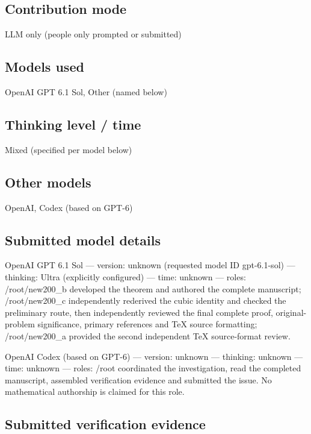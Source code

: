 \documentclass[11pt]{article}
\begin{document}
\subsection{Contribution mode}

LLM only (people only prompted or submitted)

\subsection{Models used}

OpenAI GPT 6.1 Sol, Other (named below)

\subsection{Thinking level / time}

Mixed (specified per model below)

\subsection{Other models}

OpenAI, Codex (based on GPT-6)

\subsection{Submitted model details}

OpenAI GPT 6.1 Sol  —  version: unknown (requested model ID gpt-6.1-sol)  —  thinking: Ultra (explicitly configured)  —  time: unknown  —  roles: /root/new200\_b developed the theorem and authored the complete manuscript; /root/new200\_c independently rederived the cubic identity and checked the preliminary route, then independently reviewed the final complete proof, original-problem significance, primary references and TeX source formatting; /root/new200\_a provided the second independent TeX source-format review.

OpenAI Codex (based on GPT-6)  —  version: unknown  —  thinking: unknown  —  time: unknown  —  roles: /root coordinated the investigation, read the completed manuscript, assembled verification evidence and submitted the issue. No mathematical authorship is claimed for this role.

\subsection{Submitted verification evidence}
\end{document}

